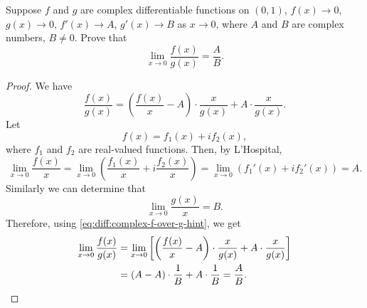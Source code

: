  Suppose $f$ and $g$ are complex differentiable functions
on $(0,1)$, $f(x)\to0$, $g(x)\to0$, $f'(x)\to A$, $g'(x)\to B$ as
$x\to0$, where $A$ and $B$ are complex numbers, $B\neq0$. Prove that
\begin{equation*}
  \lim_{x\to0}\frac{f(x)}{g(x)} = \frac{A}B.
\end{equation*}
\begin{proof}
  We have
  \begin{equation}
    \label{eq:diff:complex-f-over-g-hint}
    \frac{f(x)}{g(x)}
    = \left(\frac{f(x)}x - A\right)\cdot\frac{x}{g(x)}
    + A\cdot\frac{x}{g(x)}.
  \end{equation}
  Let
  \begin{equation*}
    f(x) = f_1(x) + if_2(x),
  \end{equation*}
  where $f_1$ and $f_2$ are real-valued functions. Then, by
  L'Hospital,
  \begin{equation*}
    \lim_{x\to0}\frac{f(x)}x
    = \lim_{x\to0}\left(\frac{f_1(x)}x + i\frac{f_2(x)}x\right)
    = \lim_{x\to0}(f_1'(x) + if_2'(x)) = A.
  \end{equation*}
  Similarly we can determine that
  \begin{equation*}
    \lim_{x\to0}\frac{g(x)}x = B.
  \end{equation*}
  Therefore, using \eqref{eq:diff:complex-f-over-g-hint}, we get
  \begin{align*}
    \lim_{x\to0}\frac{f(x)}{g(x)}
    &= \lim_{x\to0}\left[\left(\frac{f(x)}x - A\right)\cdot\frac{x}{g(x)}
      + A\cdot\frac{x}{g(x)}\right] \\
    &= (A - A)\cdot\frac1B + A\cdot\frac1B = \frac{A}B. \qedhere
  \end{align*}
\end{proof}
